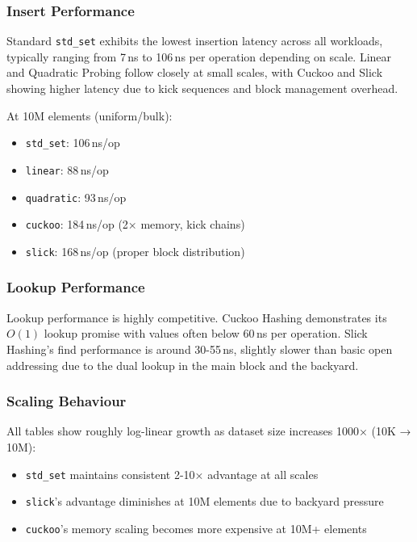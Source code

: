 \documentclass[11pt,a4paper]{article}
\begin{document}
\subsubsection{Insert Performance}

Standard \texttt{std\_set} exhibits the lowest insertion latency across all workloads, typically ranging from 7\,ns to 106\,ns per operation depending on scale. Linear and Quadratic Probing follow closely at small scales, with Cuckoo and Slick showing higher latency due to kick sequences and block management overhead.

At 10M elements (uniform/bulk):
\begin{itemize}
  \item \texttt{std\_set}: 106\,ns/op
  \item \texttt{linear}: 88\,ns/op
  \item \texttt{quadratic}: 93\,ns/op
  \item \texttt{cuckoo}: 184\,ns/op (2× memory, kick chains)
  \item \texttt{slick}: 168\,ns/op (proper block distribution)
\end{itemize}

\subsubsection{Lookup Performance}

Lookup performance is highly competitive. Cuckoo Hashing demonstrates its $O(1)$ lookup promise with values often below 60\,ns per operation. Slick Hashing's find performance is around 30-55\,ns, slightly slower than basic open addressing due to the dual lookup in the main block and the backyard.

\subsubsection{Scaling Behaviour}

All tables show roughly log-linear growth as dataset size increases 1000× (10K → 10M):
\begin{itemize}
  \item \texttt{std\_set} maintains consistent 2-10× advantage at all scales
  \item \texttt{slick}'s advantage diminishes at 10M elements due to backyard pressure
  \item \texttt{cuckoo}'s memory scaling becomes more expensive at 10M+ elements
\end{itemize}
\end{document}
